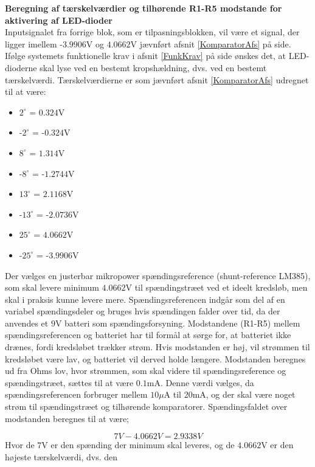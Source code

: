 \noindent\textbf{Beregning af tærskelværdier og tilhørende R1-R5 modstande for aktivering af LED-dioder} \\
Inputsignalet fra forrige blok, som er tilpasningsblokken, vil være et signal, der ligger imellem -$3.9906$V og $4.0662$V jævnført afsnit \ref{KomparatorAfs} på side\pageref{KomparatorAfs}. Ifølge systemets funktionelle krav i afsnit \ref{FunkKrav} på side \pageref{FunkKrav} ønskes det, at LED-dioderne skal lyse ved en bestemt kropshældning, dvs. ved en bestemt tærskelværdi. %
Tærskelværdierne er som jævnført afsnit \ref{KomparatorAfs} udregnet til at være:
\begin{itemize}
\item $2^{\circ}$ = $0.324$V
\item -$2^{\circ}$ = -$0.324$V
\item $8^{\circ}$ = $1.314$V
\item -$8^{\circ}$ = -$1.2744$V
\item $13^{\circ}$ = $2.1168$V
\item -$13^{\circ}$ = -$2.0736$V
\item $25^{\circ}$ = $4.0662$V
\item -$25^{\circ}$ = -$3.9906$V
\end{itemize}

Der vælges en justerbar mikropower spændingsreference (shunt-reference LM385), som skal levere minimum $4.0662$V til spændingstræet ved et ideelt kredsløb, men skal i praksis kunne levere mere. Spændingsreferencen indgår som del af en variabel spændingsdeler og bruges hvis spændingen falder over tid, da der anvendes et $9$V batteri som spændingsforsyning. Modstandene (R1-R5) mellem spændingsreferencen og batteriet har til formål at sørge for, at batteriet ikke drænes, fordi kredsløbet trækker strøm. Hvis modstanden er høj, vil strømmen til kredsløbet være lav, og batteriet vil derved holde længere. Modstanden beregnes ud fra Ohms lov, hvor strømmen, som skal videre til spændingsreference og spændingstræet, sættes til at være $0.1$mA. Denne værdi vælges, da spændingsreferencen forbruger mellem $10\mu$A til $20$mA, og der skal være noget strøm til spændingstræet og tilhørende komparatorer. Spændingsfaldet over modstanden beregnes til at være;

\begin{equation}
7V - 4.0662V = 2.9338V   
\end{equation}
Hvor de $7$V er den spænding der minimum skal leveres, og de $4.0662$V er den højeste tærskelværdi, dvs. den 


